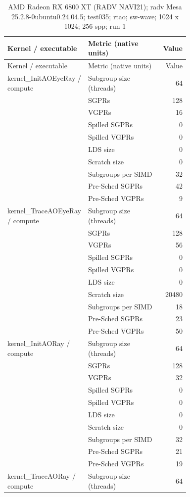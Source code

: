 \begin{longtable}{p{0.30\linewidth}p{0.43\linewidth}r}
\caption{AMD Radeon RX 6800 XT (RADV NAVI21); radv Mesa 25.2.8-0ubuntu0.24.04.5; test035; rtao; sw-wave; 1024 x 1024; 256 spp; run 1}\label{tab:hydra-profile-29}\\
\hline Kernel / executable & Metric (native units) & Value \\\hline
\endfirsthead
\hline Kernel / executable & Metric (native units) & Value \\\hline
\endhead
kernel\_InitAOEyeRay / compute & Subgroup size (threads) & 64 \\
 & SGPRs & 128 \\
 & VGPRs & 16 \\
 & Spilled SGPRs & 0 \\
 & Spilled VGPRs & 0 \\
 & LDS size & 0 \\
 & Scratch size & 0 \\
 & Subgroups per SIMD & 32 \\
 & Pre-Sched SGPRs & 42 \\
 & Pre-Sched VGPRs & 9 \\
\hline
kernel\_TraceAOEyeRay / compute & Subgroup size (threads) & 64 \\
 & SGPRs & 128 \\
 & VGPRs & 56 \\
 & Spilled SGPRs & 0 \\
 & Spilled VGPRs & 0 \\
 & LDS size & 0 \\
 & Scratch size & 20480 \\
 & Subgroups per SIMD & 18 \\
 & Pre-Sched SGPRs & 23 \\
 & Pre-Sched VGPRs & 50 \\
\hline
kernel\_InitAORay / compute & Subgroup size (threads) & 64 \\
 & SGPRs & 128 \\
 & VGPRs & 32 \\
 & Spilled SGPRs & 0 \\
 & Spilled VGPRs & 0 \\
 & LDS size & 0 \\
 & Scratch size & 0 \\
 & Subgroups per SIMD & 32 \\
 & Pre-Sched SGPRs & 21 \\
 & Pre-Sched VGPRs & 19 \\
\hline
kernel\_TraceAORay / compute & Subgroup size (threads) & 64 \\

\end{longtable}
